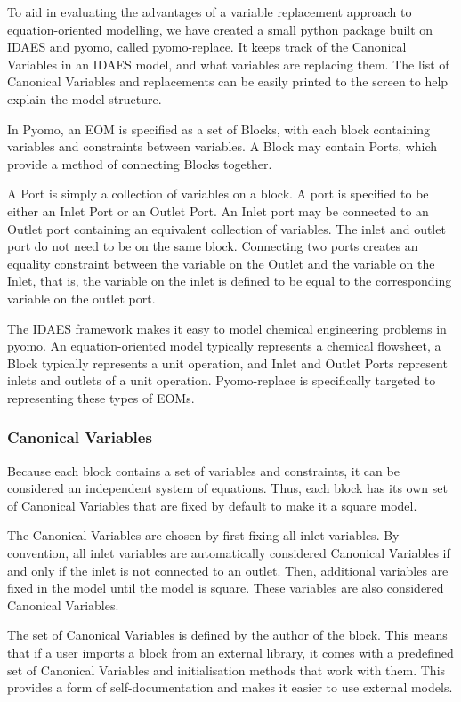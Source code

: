 To aid in evaluating the advantages of a variable replacement approach
to equation-oriented modelling, we have created a small python package
built on IDAES and pyomo, called pyomo-replace. It keeps track of the Canonical Variables
in an IDAES model, and what variables are replacing them. The list of
Canonical Variables and replacements can be easily printed to the screen to
help explain the model structure.

In Pyomo, an EOM is specified as a set of Blocks, with each block
containing variables and constraints between variables. A Block may
contain Ports, which provide a method of connecting Blocks together.

A Port is simply a collection of variables on a block. A port is
specified to be either an Inlet Port or an Outlet Port. An Inlet port
may be connected to an Outlet port containing an equivalent collection
of variables. The inlet and outlet port do not need to be on the same
block. Connecting two ports creates an equality constraint between the
variable on the Outlet and the variable on the Inlet, that is, the
variable on the inlet is defined to be equal to the corresponding
variable on the outlet port.

The IDAES framework makes it easy to model chemical engineering problems
in pyomo. An equation-oriented model typically represents a chemical
flowsheet, a Block typically represents a unit operation, and Inlet and
Outlet Ports represent inlets and outlets of a unit operation.
Pyomo-replace is specifically targeted to representing these types of
EOMs.

\hypertarget{state-variables}{%
\subsubsection{Canonical Variables}\label{state-variables}}

Because each block contains a set of variables and constraints, it can
be considered an independent system of equations.
Thus, each block has its own set of Canonical Variables that are fixed by default to make it a square model.

The Canonical Variables are chosen by first fixing all inlet variables. By
convention, all inlet variables are automatically considered Canonical
Variables if and only if the inlet is not connected to an outlet. Then,
additional variables are fixed in the model until the model is square.
These variables are also considered Canonical Variables.

The set of Canonical Variables is defined by the author of
the block. This means that if a user imports a block from an external library,
it comes with a predefined set of Canonical Variables and initialisation methods that work with them.
This provides a form of self-documentation and makes it easier to use
external models.

